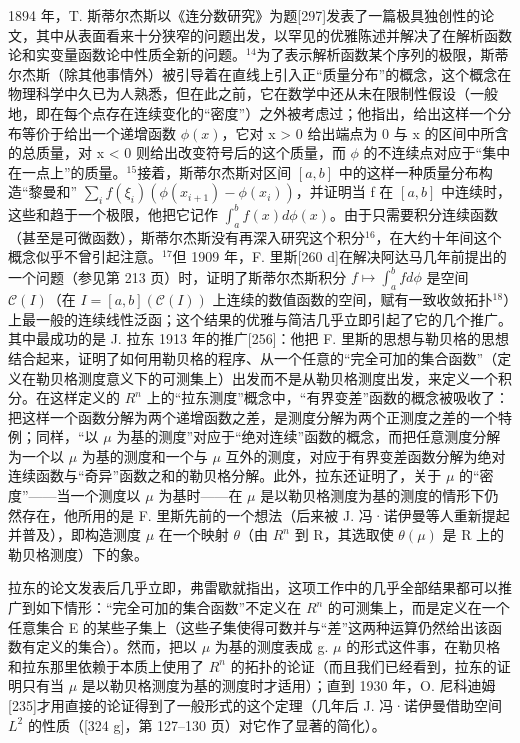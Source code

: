 1894 年，T. 斯蒂尔杰斯以《连分数研究》为题{[}297{]}发表了一篇极具独创性的论文，其中从表面看来十分狭窄的问题出发，以罕见的优雅陈述并解决了在解析函数论和实变量函数论中性质全新的问题。\(^{14}\)为了表示解析函数某个序列的极限，斯蒂尔杰斯（除其他事情外）被引导着在直线上引入正“质量分布”的概念，这个概念在物理科学中久已为人熟悉，但在此之前，它在数学中还从未在限制性假设（一般地，即在每个点存在连续变化的“密度”）之外被考虑过；他指出，给出这样一个分布等价于给出一个递增函数 \(\phi(x)\)，它对 x \textgreater{} 0 给出端点为 0 与 x 的区间中所含的总质量，对 x \textless{} 0 则给出改变符号后的这个质量，而 \(\phi\) 的不连续点对应于“集中在一点上”的质量。\(^{15}\)接着，斯蒂尔杰斯对区间 \([a, b]\) 中的这样一种质量分布构造“黎曼和” \(\sum_{i} f(\xi_{i})(\phi(x_{i+1}) - \phi(x_{i}))\)，并证明当 f 在 \([a, b]\) 中连续时，这些和趋于一个极限，他把它记作 \(\int_{a}^{b} f(x) d\phi(x)\)。由于只需要积分连续函数（甚至是可微函数），斯蒂尔杰斯没有再深入研究这个积分\(^{16}\)，在大约十年间这个概念似乎不曾引起注意。\(^{17}\)但 1909 年，F. 里斯{[}260 d{]}在解决阿达马几年前提出的一个问题（参见第 213 页）时，证明了斯蒂尔杰斯积分 \(f \mapsto \int_{a}^{b} fd\phi\) 是空间 \(\mathcal{C}(I)\)（在 \(I = [a, b] (\mathcal{C}(I))\) 上连续的数值函数的空间，赋有一致收敛拓扑\(^{18}\)）上最一般的连续线性泛函；这个结果的优雅与简洁几乎立即引起了它的几个推广。其中最成功的是 J. 拉东 1913 年的推广{[}256{]}：他把 F. 里斯的思想与勒贝格的思想结合起来，证明了如何用勒贝格的程序、从一个任意的“完全可加的集合函数”（定义在勒贝格测度意义下的可测集上）出发而不是从勒贝格测度出发，来定义一个积分。在这样定义的 \(R^{n}\) 上的“拉东测度”概念中，“有界变差”函数的概念被吸收了：把这样一个函数分解为两个递增函数之差，是测度分解为两个正测度之差的一个特例；同样，“以 \(\mu\) 为基的测度”对应于“绝对连续”函数的概念，而把任意测度分解为一个以 \(\mu\) 为基的测度和一个与 \(\mu\) 互外的测度，对应于有界变差函数分解为绝对连续函数与“奇异”函数之和的勒贝格分解。此外，拉东还证明了，关于 \(\mu\) 的“密度”——当一个测度以 \(\mu\) 为基时——在 \(\mu\) 是以勒贝格测度为基的测度的情形下仍然存在，他所用的是 F. 里斯先前的一个想法（后来被 J. 冯·诺伊曼等人重新提起并普及），即构造测度 \(\mu\) 在一个映射 \(\theta\)（由 \(R^{n}\) 到 R，其选取使 \(\theta(\mu)\) 是 R 上的勒贝格测度）下的象。

拉东的论文发表后几乎立即，弗雷歇就指出，这项工作中的几乎全部结果都可以推广到如下情形：“完全可加的集合函数”不定义在 \(R^{n}\) 的可测集上，而是定义在一个任意集合 E 的某些子集上（这些子集使得可数并与“差”这两种运算仍然给出该函数有定义的集合）。然而，把以 \(\mu\) 为基的测度表成 g. \(\mu\) 的形式这件事，在勒贝格和拉东那里依赖于本质上使用了 \(R^{n}\) 的拓扑的论证（而且我们已经看到，拉东的证明只有当 \(\mu\) 是以勒贝格测度为基的测度时才适用）；直到 1930 年，O. 尼科迪姆{[}235{]}才用直接的论证得到了一般形式的这个定理（几年后 J. 冯·诺伊曼借助空间 \(L^{2}\) 的性质（{[}324 g{]}，第 127–130 页）对它作了显著的简化）。

